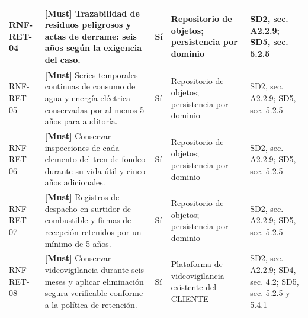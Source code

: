 \begin{paginaHorizontalSynaptix}
\begin{longtable}{|L{0.09\AnchoMatrizTDoce}|L{0.385\AnchoMatrizTDoce}|L{0.065\AnchoMatrizTDoce}|L{0.18\AnchoMatrizTDoce}|L{0.28\AnchoMatrizTDoce}|}
RNF-\allowbreak{}RET-\allowbreak{}04 &
\textbf{[Must]} Trazabilidad de residuos peligrosos y actas de derrame: seis años según la exigencia del caso. &
Sí &
Repositorio de objetos; persistencia por dominio &
SD2, sec. A2.2.9; SD5, sec. 5.2.5 \\ \hline

RNF-\allowbreak{}RET-\allowbreak{}05 &
\textbf{[Must]} Series temporales continuas de consumo de agua y energía eléctrica conservadas por al menos 5 años para auditoría. &
Sí &
Repositorio de objetos; persistencia por dominio &
SD2, sec. A2.2.9; SD5, sec. 5.2.5 \\ \hline

RNF-\allowbreak{}RET-\allowbreak{}06 &
\textbf{[Must]} Conservar inspecciones de cada elemento del tren de fondeo durante su vida útil y cinco años adicionales. &
Sí &
Repositorio de objetos; persistencia por dominio &
SD2, sec. A2.2.9; SD5, sec. 5.2.5 \\ \hline

RNF-\allowbreak{}RET-\allowbreak{}07 &
\textbf{[Must]} Registros de despacho en surtidor de combustible y firmas de recepción retenidos por un mínimo de 5 años. &
Sí &
Repositorio de objetos; persistencia por dominio &
SD2, sec. A2.2.9; SD5, sec. 5.2.5 \\ \hline

RNF-\allowbreak{}RET-\allowbreak{}08 &
\textbf{[Must]} Conservar videovigilancia durante seis meses y aplicar eliminación segura verificable conforme a la política de retención. &
Sí &
Plataforma de videovigilancia existente del CLIENTE &
SD2, sec. A2.2.9; SD4, sec. 4.2; SD5, sec. 5.2.5 y 5.4.1 \\ \hline
\end{longtable}



\end{paginaHorizontalSynaptix}
